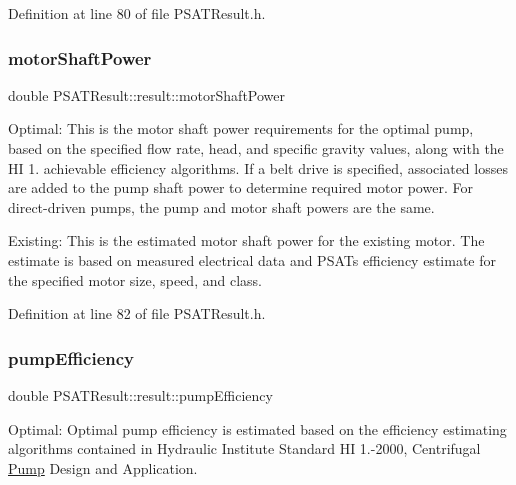 Definition at line 80 of file P\+S\+A\+T\+Result.\+h.

\mbox{\label{struct_p_s_a_t_result_1_1result_a8050ab06ea7a603ad5e5db66e6456c7f}} 
\subsubsection{\texorpdfstring{motor\+Shaft\+Power}{motorShaftPower}}
{\footnotesize\ttfamily double P\+S\+A\+T\+Result\+::result\+::motor\+Shaft\+Power}



Optimal\+: This is the motor shaft power requirements for the optimal pump, based on the specified flow rate, head, and specific gravity values, along with the HI 1. achievable efficiency algorithms. If a belt drive is specified, associated losses are added to the pump shaft power to determine required motor power. For direct-\/driven pumps, the pump and motor shaft powers are the same. 

Existing\+: This is the estimated motor shaft power for the existing motor. The estimate is based on measured electrical data and P\+S\+AT\textquotesingle{}s efficiency estimate for the specified motor size, speed, and class. 

Definition at line 82 of file P\+S\+A\+T\+Result.\+h.

\mbox{\label{struct_p_s_a_t_result_1_1result_ab3658ff7a740a5b846b216e9efab0f6f}} 
\subsubsection{\texorpdfstring{pump\+Efficiency}{pumpEfficiency}}
{\footnotesize\ttfamily double P\+S\+A\+T\+Result\+::result\+::pump\+Efficiency}



Optimal\+: Optimal pump efficiency is estimated based on the efficiency estimating algorithms contained in Hydraulic Institute Standard HI 1.-\/2000, Centrifugal \hyperlink{class_pump}{Pump} Design and Application. 

